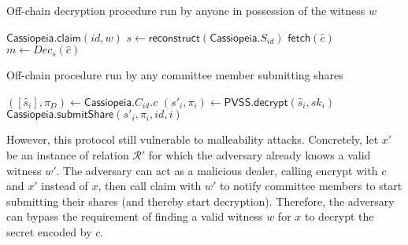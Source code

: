 \begin{algorithm}[h]
    \caption{Off-chain decryption procedure run by anyone in possession of the witness $w$}
    \label{alg:decryption_no_incentives}
    \begin{algorithmic}[1]
            \State $\textsf{Cassiopeia.claim}(id, w)$
                \State $s \gets \textsf{reconstruct}(\textsf{Cassiopeia}.S_{id})$
                \State $\textsf{fetch}(\hat{c})$
                \State $m \gets Dec_s(\hat{c})$
            \EndOn
        \EndFunction
    \end{algorithmic}
\end{algorithm}

\begin{algorithm}[h]
    \caption{Off-chain procedure run by any committee member submitting shares}
\label{alg:committee_member_no_incentives}
    \begin{algorithmic}[1]
            \State $([\hat{s}_i], \pi_D) \gets \textsf{Cassiopeia}.C_{id}.c$
            \State $(s'_i, \pi_i) \gets \textsf{PVSS.decrypt}(\hat{s}_i, sk_i)$
            \State $\textsf{Cassiopeia.submitShare}(s'_i, \pi_i, id, i)$
        \EndOn
    \end{algorithmic}
\end{algorithm}

However, this protocol still vulnerable to malleability attacks.
Concretely, let $x'$ be an instance of relation $\mathcal{R}'$ for which the adversary already knows a valid witness $w'$.
The adversary can act as a malicious dealer, calling \textsf{encrypt} with $c$ and $x'$ instead of $x$, then call \textsf{claim} with $w'$ to notify committee members to start submitting their shares (and thereby start decryption).
Therefore, the adversary can bypass the requirement of finding a valid witness $w$ for $x$ to decrypt the secret encoded by $c$.

